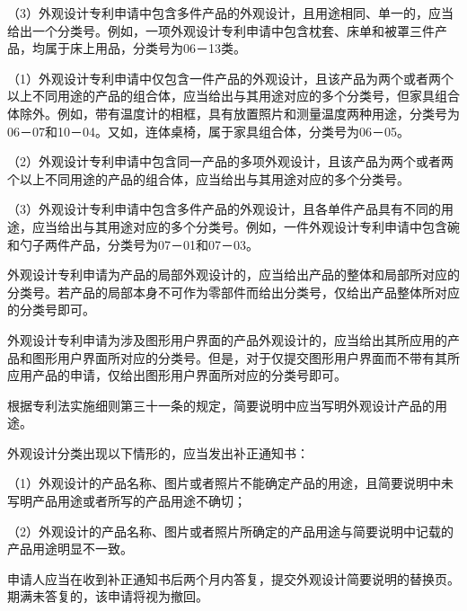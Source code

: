 {\setlength{\parindent}{17.1bp}（3）外观设计专利申请中包含多件产品的外观设计，且用途相同、单一的，应当给出一个分类号。例如，一项外观设计专利申请中包含枕套、床单和被罩三件产品，均属于床上用品，分类号为06－13类。\par}

{\setlength{\parindent}{17.1bp}（1）外观设计专利申请中仅包含一件产品的外观设计，且该产品为两个或者两个以上不同用途的产品的组合体，应当给出与其用途对应的多个分类号，但家具组合体除外。例如，带有温度计的相框，具有放置照片和测量温度两种用途，分类号为06－07和10－04。又如，连体桌椅，属于家具组合体，分类号为06－05。\par}

{\setlength{\parindent}{17.1bp}（2）外观设计专利申请中包含同一产品的多项外观设计，且该产品为两个或者两个以上不同用途的产品的组合体，应当给出与其用途对应的多个分类号。\par}

{\setlength{\parindent}{17.1bp}（3）外观设计专利申请中包含多件产品的外观设计，且各单件产品具有不同的用途，应当给出与其用途对应的多个分类号。例如，一件外观设计专利申请中包含碗和勺子两件产品，分类号为07－01和07－03。\par}

外观设计专利申请为产品的局部外观设计的，应当给出产品的整体和局部所对应的分类号。若产品的局部本身不可作为零部件而给出分类号，仅给出产品整体所对应的分类号即可。

外观设计专利申请为涉及图形用户界面的产品外观设计的，应当给出其所应用的产品和图形用户界面所对应的分类号。但是，对于仅提交图形用户界面而不带有其所应用产品的申请，仅给出图形用户界面所对应的分类号即可。

根据专利法实施细则第三十一条的规定，简要说明中应当写明外观设计产品的用途。

外观设计分类出现以下情形的，应当发出补正通知书：

{\setlength{\parindent}{17.1bp}（1）外观设计的产品名称、图片或者照片不能确定产品的用途，且简要说明中未写明产品用途或者所写的产品用途不确切；\par}

{\setlength{\parindent}{17.1bp}（2）外观设计的产品名称、图片或者照片所确定的产品用途与简要说明中记载的产品用途明显不一致。\par}

申请人应当在收到补正通知书后两个月内答复，提交外观设计简要说明的替换页。期满未答复的，该申请将视为撤回。


